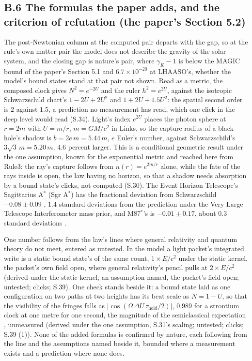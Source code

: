 \documentclass[pdflatex,sn-mathphys-num]{sn-jnl}
\theoremstyle{thmstyleone}
\begin{document}
\subsection*{B.6 The formulas the paper adds, and the criterion of refutation (the paper's Section 5.2)}

The post-Newtonian column at the computed pair departs with the gap, so at the rule's own matter pair the model does not describe the gravity of the solar system, and the closing gap is nature's pair, where $\gamma_K - 1$ is below the MAGIC bound of the paper's Section 5.1 and $6.7 \times 10^{-20}$ at LHAASO's, whether the model's bound states stand at that pair not shown. Read as a metric, the composed clock gives $N^2 = e^{-2U}$ and the ruler $h^2 = e^{2U}$, against the isotropic Schwarzschild chart's $1 - 2U + 2U^2$ and $1 + 2U + 1.5U^2$: the spatial second order is $2$ against $1.5$, a prediction no measurement has read, which one click in the deep level would read (S.34). Light's index $e^{2U}$ places the photon sphere at $r = 2m$ with $U = m / r$, $m = GM / c^2$ in Links, so the capture radius of a black hole's shadow is $b = 2e\,m = 5.44\,m$, $e$ Euler's number, against Schwarzschild's $3\sqrt 3\,m = 5.20\,m$, $4.6$ percent larger. This is a conditional geometric result under the one assumption, known for the exponential metric \cite{yilmaz}\cite{boonserm} and reached here from Rule3: the ray's capture follows from $n(r) = e^{2m / r}$ alone, while the fate of the rays inside is open, the law having no horizon, so that a shadow needs absorption by a bound state's clicks, not computed (S.30). The Event Horizon Telescope's Sagittarius A$^*$ (Sgr A$^*$) has the fractional deviation from Schwarzschild $-0.08 \pm 0.09$ \cite{eht_sgra}, $1.4$ standard deviations from the prediction under the Very Large Telescope Interferometer mass prior, and M87$^*$'s is $-0.01 \pm 0.17$, about $0.3$ standard deviations \cite{psaltis}.

One number follows from the law's lines where general relativity and quantum theory do not meet, entered as untested. In the model a light packet's integrated write is a static bound state's of the same count, $1 \times E / c^2$ under the static kernel, the packet's own field open, where general relativity's pencil pulls at $2 \times E / c^2$ \cite{tolman} (derived under the static kernel, an assumption named, the packet's field open; untested; clicks; S.39). One check stands beside it: a bound state laid as one configuration on two paths at two heights has its beat scale as $N = 1 - U$, so that the visibility of the fringes falls as $|\cos(\Omega\,\Delta U\,\tau_{\mathrm{hold}} / 2)|$, $0.989$ for a strontium clock at one metre for one second, the magnitude of the semiclassical expectation \cite{zych}, unmeasured (derived under the one assumption, S.31's scaling; untested; clicks; S.39 (1)). None of the added formulas is confirmed by nature, each following from the line and the assumptions named beside it, bounded where a measurement exists and a prediction where none does.
\end{document}
